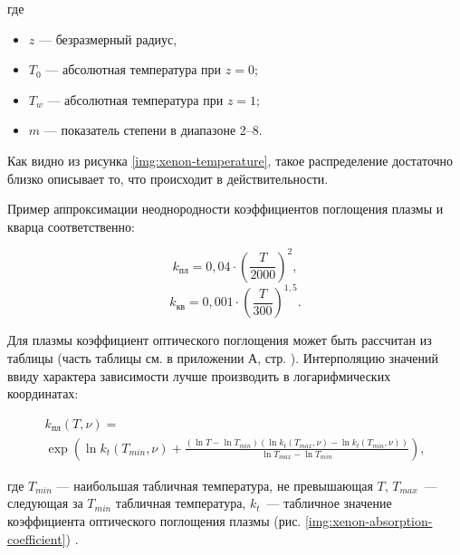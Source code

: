 \noindent где
\begin{itemize}
	\item $z$ — безразмерный радиус,
	\item $T_0$ — абсолютная температура при $z = 0$;
	\item $T_w$ — абсолютная температура при $z = 1$;
	\item $m$ — показатель степени в диапазоне 2–8.
\end{itemize}



Как видно из рисунка \ref{img:xenon-temperature}, такое распределение достаточно близко описывает то, что происходит в действительности.

Пример аппроксимации неоднородности коэффициентов поглощения плазмы и кварца соответственно:

\begin{equation}
	\label{eqn:absorption-coefficient-plasma}
	k_{\text{пл}} = 0,04 \cdot \left(\frac{T}{2000}\right)^2,
\end{equation}
\begin{equation}
	\label{eqn:absorption-coefficient-quartz}
	k_{\text{кв}} = 0,001 \cdot \left(\frac{T}{300}\right)^{1,5}.
\end{equation}

Для плазмы коэффициент оптического поглощения может быть рассчитан из таблицы (часть таблицы см. в приложении А, стр. \pageref{toc:attachment-a}).
Интерполяцию значений ввиду характера зависимости лучше производить в логарифмических координатах:

\begin{equation}
	\begin{matrix}
		k_{\text{пл}}(T, \nu) = \\
		\exp{\left(\ln{k_t(T_{min}, \nu)} + \frac{(\ln{T} - \ln{T_{min}})(\ln{k_t(T_{max}, \nu)} - \ln{k_t(T_{min}, \nu)})}{\ln{T_{max}} - \ln{T_{min}}}\right)},
	\end{matrix}
\end{equation}

\noindent где $T_{min}$ — наибольшая табличная температура, не превышающая $T$, $T_{max}$~— следующая за $T_{min}$ табличная температура, $k_t$~— табличное значение коэффициента оптического поглощения плазмы (рис. \ref{img:xenon-absorption-coefficient}) \cite{kerimov-1}.

